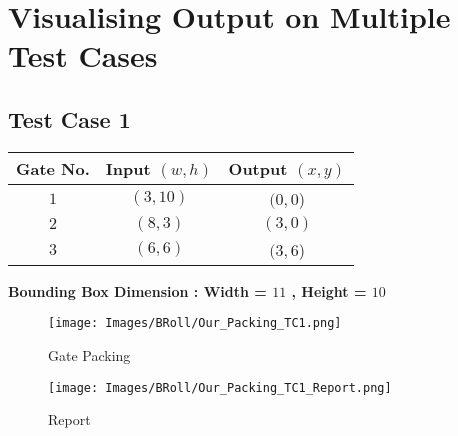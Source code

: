 \documentclass[12pt, a4paper,openany]{article}
\begin{document}
\section{Visualising Output on Multiple Test Cases}

\subsection{Test Case 1}
\begin{center}
\begin{tabular}{|c|c|c|}
    \hline
    \rowcolor[HTML]{DAE8FC} Gate No. &
    Input \((w,h)\)                                    & Output \((x,y)\)   \\ \hline
    \rowcolor[HTML]{FFFC9E} {\color[HTML]{000000} \(1\)} &
    {\color[HTML]{000000} \((3,10)\)}                         & {\color[HTML]{000000} \((0,0\))}    \\ \hline
    \rowcolor[HTML]{FFFC9E} 
    {\color[HTML]{000000} \(2\)} &
    {\color[HTML]{000000} \((8,3)\)}                         & {\color[HTML]{000000} \((3,0)\)}      \\ \hline
     \rowcolor[HTML]{FFFC9E} 
     {\color[HTML]{000000} \(3\)} &
    {\color[HTML]{000000} \((6,6)\)}                         & {\color[HTML]{000000} \((3,6\))}      \\ \hline
    
\end{tabular}
\end{center}
\begin{center}
\textbf{Bounding Box Dimension : Width = \(11\) , Height = \(10\)}    
\end{center}
\begin{figure}[ht]
    \centering
    \begin{minipage}{.6\textwidth}
          \centering
          \texttt{[image: Images/BRoll/Our\_Packing\_TC1.png]}
          \label{fig:tc-1}
          \caption{Gate Packing }
      
          \texttt{[image: Images/BRoll/Our\_Packing\_TC1\_Report.png]}
          \label{fig:tcr-1}
          \caption{Report}
          \centering 
      \end{minipage}
    \end{figure}
    
\newpage
\end{document}
